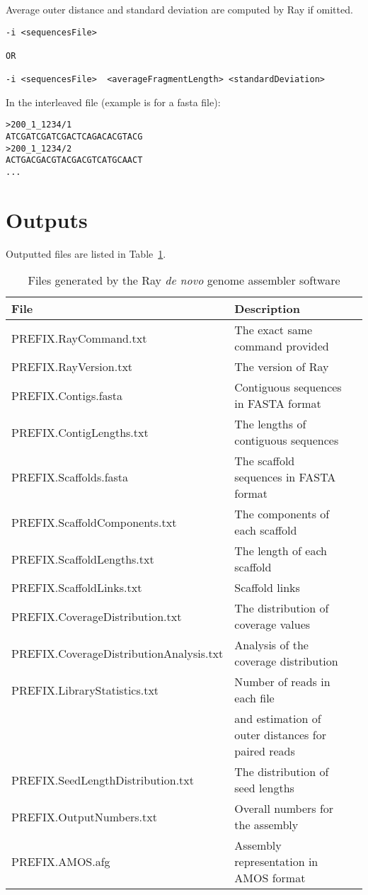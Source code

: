 \documentclass{article}
\begin{document}
Average outer distance and standard deviation are computed by Ray if omitted.

\begin{verbatim}
-i <sequencesFile>

OR

-i <sequencesFile>  <averageFragmentLength> <standardDeviation> 
\end{verbatim}

In the interleaved file (example is for a fasta file):

\begin{verbatim}
>200_1_1234/1
ATCGATCGATCGACTCAGACACGTACG
>200_1_1234/2
ACTGACGACGTACGACGTCATGCAACT
...
\end{verbatim}



\section{Outputs}

Outputted files are listed in Table~\ref{outputs}.

\begin{table}[h]
\caption{Files generated by the Ray \emph{de novo} genome assembler software}\label{outputs}
\begin{tabular}{lll}
\hline
File& Description\\
\hline
PREFIX.RayCommand.txt & The exact same command provided \\
PREFIX.RayVersion.txt & The version of Ray\\
PREFIX.Contigs.fasta & Contiguous sequences in FASTA format\\
PREFIX.ContigLengths.txt & The lengths of contiguous sequences\\
PREFIX.Scaffolds.fasta & The scaffold sequences in FASTA format \\
PREFIX.ScaffoldComponents.txt & The components of each scaffold\\
PREFIX.ScaffoldLengths.txt & The length of each scaffold \\
PREFIX.ScaffoldLinks.txt & Scaffold links \\
PREFIX.CoverageDistribution.txt & The distribution of coverage values \\
PREFIX.CoverageDistributionAnalysis.txt & Analysis of the coverage distribution \\
PREFIX.LibraryStatistics.txt & Number of reads in each file \\
 & and estimation of outer distances for paired reads \\
PREFIX.SeedLengthDistribution.txt & The distribution of seed lengths \\
PREFIX.OutputNumbers.txt & Overall numbers for the assembly\\
PREFIX.AMOS.afg & Assembly representation in AMOS format \\
\hline
\end{tabular}
\end{table}
\end{document}
